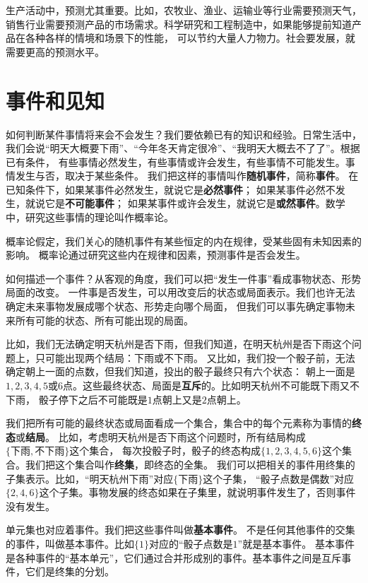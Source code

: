 \documentclass[12pt,UTF8]{ctexbook}
\begin{document}
生产活动中，预测尤其重要。比如，农牧业、渔业、运输业等行业需要预测天气，
销售行业需要预测产品的市场需求。科学研究和工程制造中，如果能够提前知道产品在各种各样的情境和场景下的性能，
可以节约大量人力物力。社会要发展，就需要更高的预测水平。

\section{事件和见知}

如何判断某件事情将来会不会发生？我们要依赖已有的知识和经验。日常生活中，
我们会说“明天大概要下雨”、“今年冬天肯定很冷”、“我明天大概去不了了”。根据已有条件，
有些事情必然发生，有些事情或许会发生，有些事情不可能发生。事情发生与否，取决于某些条件。
我们把这样的事情叫作\textbf{随机事件}，简称\textbf{事件}。
在已知条件下，如果某事件必然发生，就说它是\textbf{必然事件}；
如果某事件必然不发生，就说它是\textbf{不可能事件}；
如果某事件或许会发生，就说它是\textbf{或然事件}。数学中，研究这些事情的理论叫作概率论。

概率论假定，我们关心的随机事件有某些恒定的内在规律，受某些固有未知因素的影响。
概率论通过研究这些内在规律和因素，预测事件是否会发生。

如何描述一个事件？从客观的角度，我们可以把“发生一件事”看成事物状态、形势局面的改变。
一件事是否发生，可以用改变后的状态或局面表示。我们也许无法确定未来事物发展成哪个状态、形势走向哪个局面，
但我们可以事先确定事物未来所有可能的状态、所有可能出现的局面。

比如，我们无法确定明天杭州是否下雨，但我们知道，在明天杭州是否下雨这个问题上，只可能出现两个结局：下雨或不下雨。
又比如，我们投一个骰子前，无法确定朝上一面的点数，但我们知道，投出的骰子最终只有六个状态：
朝上一面是$1,2,3,4,5$或$6$点。这些最终状态、局面是\textbf{互斥}的。比如明天杭州不可能既下雨又不下雨，
骰子停下之后不可能既是$1$点朝上又是$2$点朝上。

我们把所有可能的最终状态或局面看成一个集合，集合中的每个元素称为事情的\textbf{终态}或\textbf{结局}。
比如，考虑明天杭州是否下雨这个问题时，所有结局构成$\{\mbox{下雨}, \mbox{不下雨}\}$这个集合，
每次投骰子时，骰子的终态构成$\{1,2,3,4,5,6\}$这个集合。我们把这个集合叫作\textbf{终集}，即终态的全集。
我们可以把相关的事件用终集的子集表示。比如，“明天杭州下雨”对应$\{\mbox{下雨}\}$这个子集，
“骰子点数是偶数”对应$\{2,4,6\}$这个子集。事物发展的终态如果在子集里，就说明事件发生了，否则事件没有发生。

单元集也对应着事件。我们把这些事件叫做\textbf{基本事件}。
不是任何其他事件的交集的事件，叫做基本事件。比如$\{1\}$对应的“骰子点数是$1$”就是基本事件。
基本事件是各种事件的“基本单元”，它们通过合并形成别的事件。基本事件之间是互斥事件，它们是终集的分划。
\end{document}
